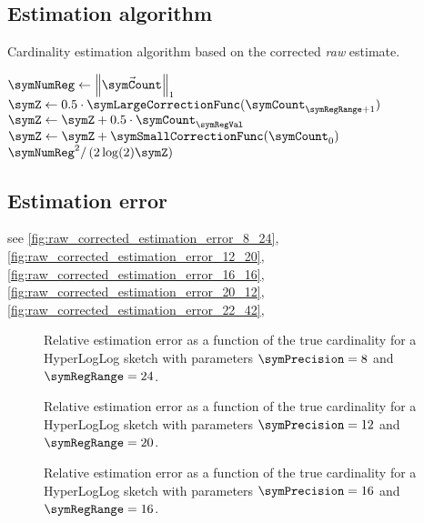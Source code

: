 \documentclass[a4paper]{scrartcl}
\begin{document}
\subsection{Estimation algorithm}
\begin{algorithm}
\caption{Cardinality estimation algorithm based on the corrected \emph{raw} estimate.}
\label{alg:estimate_raw_corrected}
\begin{algorithmic}
\State $\symNumReg \gets \left\Vert\vec{\symCount}\right\Vert_1$
\State $\symZ\gets 0.5\cdot \symLargeCorrectionFunc(\symCount_{\symRegRange+1})$
\State $\symZ\gets\symZ + 0.5\cdot \symCount_\symRegVal$
\EndFor
\State $\symZ\gets\symZ+\symSmallCorrectionFunc(\symCount_0)$
\State \Return$\symNumReg^2 / \left(2\log(2)\symZ\right)$
\EndFunction
\end{algorithmic}
\end{algorithm}


\subsection{Estimation error}

see \autoref{fig:raw_corrected_estimation_error_8_24}, \autoref{fig:raw_corrected_estimation_error_12_20},
\autoref{fig:raw_corrected_estimation_error_16_16},
\autoref{fig:raw_corrected_estimation_error_20_12},
\autoref{fig:raw_corrected_estimation_error_22_42},

\begin{figure}
\centering

\caption{Relative estimation error as a function of the true cardinality for a HyperLogLog sketch with parameters $\symPrecision = 8$ and $\symRegRange=24$.}
\label{fig:raw_corrected_estimation_error_8_24}
\end{figure}

\begin{figure}
\centering

\caption{Relative estimation error as a function of the true cardinality for a HyperLogLog sketch with parameters $\symPrecision = 12$ and $\symRegRange=20$.}
\label{fig:raw_corrected_estimation_error_12_20}
\end{figure}

\begin{figure}
\centering

\caption{Relative estimation error as a function of the true cardinality for a HyperLogLog sketch with parameters $\symPrecision = 16$ and $\symRegRange=16$.}
\label{fig:raw_corrected_estimation_error_16_16}
\end{figure}
\end{document}
